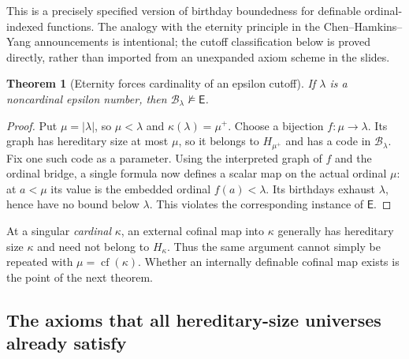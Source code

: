 \documentclass[11pt,letterpaper]{article}
\newtheorem{theorem}{Theorem}[section]
\theoremstyle{definition}
\theoremstyle{remark}
\newcommand{\B}{\mathcal B}
\newcommand{\Etern}{\mathsf E}
\newcommand{\card}[1]{\lvert#1\rvert}
\begin{document}
This is a precisely specified version of birthday boundedness for definable
ordinal-indexed functions. The analogy with the eternity principle in the
Chen--Hamkins--Yang announcements is intentional; the cutoff classification
below is proved directly, rather than imported from an unexpanded axiom
scheme in the slides.

\begin{theorem}[Eternity forces cardinality of an epsilon cutoff]
\label{thm:eternity-noncardinal}
If $\lambda$ is a noncardinal epsilon number, then
$\B_\lambda\not\models\Etern$.
\end{theorem}
\begin{proof}
Put $\mu=\card\lambda$, so $\mu<\lambda$ and
$\kappa(\lambda)=\mu^+$. Choose a bijection $f:\mu\to\lambda$.
Its graph has hereditary size at most $\mu$, so it belongs to
$H_{\mu^+}$ and has a code in $\B_\lambda$. Fix one such code as a
parameter. Using the interpreted graph of $f$ and the ordinal bridge, a
single formula now defines a scalar map on the actual ordinal $\mu$:
at $a<\mu$ its value is the embedded ordinal $f(a)<\lambda$.
Its birthdays exhaust $\lambda$, hence have no bound below $\lambda$.
This violates the corresponding instance of $\Etern$.
\end{proof}

At a singular \emph{cardinal} $\kappa$, an external cofinal map into
$\kappa$ generally has hereditary size $\kappa$ and need not belong to
$H_\kappa$. Thus the same argument cannot simply be repeated with
$\mu=\operatorname{cf}(\kappa)$. Whether an internally definable cofinal
map exists is the point of the next theorem.

\subsection{The axioms that all hereditary-size universes already satisfy}
\end{document}
